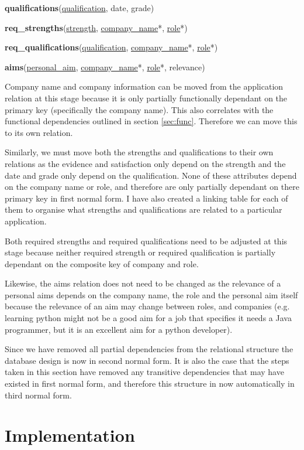 \documentclass{article}
\begin{document}
\textbf{qualifications}(\underline{qualification}, date, grade)

\textbf{req\_strengths}(\underline{strength}, \underline{company\_name}*, \underline{role}*)

\textbf{req\_qualifications}(\underline{qualification}, \underline{company\_name}*, \underline{role}*)

\textbf{aims}(\underline{personal\_aim}, \underline{company\_name}*, \underline{role}*, relevance)

Company name and company information can be moved from the application relation at this stage because it is only partially functionally dependant on the primary key (specifically the company name). This also correlates with the functional dependencies outlined in section \ref{sec:func}. Therefore we can move this to its own relation.

Similarly, we must move both the strengths and qualifications to their own relations as the evidence and satisfaction only depend on the strength and the date and grade only depend on the qualification. None of these attributes depend on the company name or role, and therefore are only partially dependant on there primary key in first normal form. I have also created a linking table for each of them to organise what strengths and qualifications are related to a particular application.

Both required strengths and required qualifications need to be adjusted at this stage because neither required strength or required qualification is partially dependant on the composite key of company and role. 

Likewise, the aims relation does not need to be changed as the relevance of a personal aims depends on the company name, the role and the personal aim itself because the relevance of an aim may change between roles, and companies (e.g. learning python might not be a good aim for a job that specifies it needs a Java programmer, but it is an excellent aim for a python developer).

Since we have removed all partial dependencies from the relational structure the database design is now in second normal form. It is also the case that the steps taken in this section have removed any transitive dependencies that may have existed in first normal form, and therefore this structure in now automatically in third normal form.

\section{Implementation}
\end{document}
